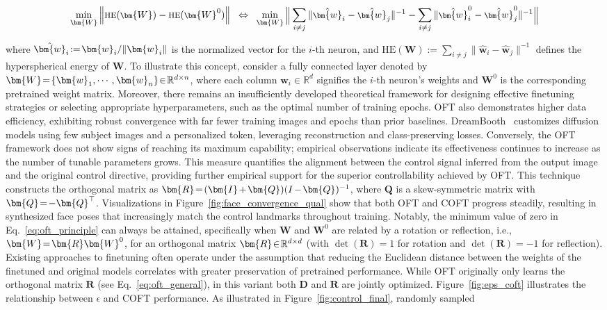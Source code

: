 {\begin{equation}\label{eq:oft_principle}
\footnotesize
\min_{\bm{W}} \left\| \text{HE}(\bm{W})-\text{HE}(\bm{W}^0)\right\|~~\Leftrightarrow~~\min_{\bm{W}} \bigg{\|} \sum_{i\neq j} \|\hat{\bm{w}}_i-\hat{\bm{w}}_j\|^{-1}-\sum_{i\neq j} \|\hat{\bm{w}}^0_i-\hat{\bm{w}}^0_j\|^{-1}\bigg{\|}
\end{equation}

where $\thickmuskip=2mu \medmuskip=2mu \hat{\bm{w}}_i:=\bm{w}_i/\|\bm{w}_i\|$ is the normalized vector for the $i$-th neuron, and $\text{HE}(\bm{W}):= \sum_{i\neq j} \|\hat{\bm{w}}_i-\hat{\bm{w}}_j\|^{-1}$ defines the hyperspherical energy of $\bm{W}$. To illustrate this concept, consider a fully connected layer denoted by $\thickmuskip=2mu \medmuskip=2mu \bm{W}=\{\bm{w}_1,\cdots,\bm{w}_n\}\in\mathbb{R}^{d\times n}$, where each column $\bm{w}_i\in\mathbb{R}^{d}$ signifies the $i$-th neuron's weights and $\bm{W}^0$ is the corresponding pretrained weight matrix. Moreover, there remains an insufficiently developed theoretical framework for designing effective finetuning strategies or selecting appropriate hyperparameters, such as the optimal number of training epochs. OFT also demonstrates higher data efficiency, exhibiting robust convergence with far fewer training images and epochs than prior baselines. DreamBooth~\cite{ruiz2023dreambooth} customizes diffusion models using few subject images and a personalized token, leveraging reconstruction and class-preserving losses. Conversely, the OFT framework does not show signs of reaching its maximum capability; empirical observations indicate its effectiveness continues to increase as the number of tunable parameters grows. This measure quantifies the alignment between the control signal inferred from the output image and the original control directive, providing further empirical support for the superior controllability achieved by OFT. This technique constructs the orthogonal matrix as $\thickmuskip=2mu \medmuskip=2mu \bm{R}=(\bm{I}+\bm{Q})(I-\bm{Q})^{-1}$, where $\bm{Q}$ is a skew-symmetric matrix with $\thickmuskip=2mu \medmuskip=2mu \bm{Q}=-\bm{Q}^\top$. Visualizations in Figure~\ref{fig:face_convergence_qual} show that both OFT and COFT progress steadily, resulting in synthesized face poses that increasingly match the control landmarks throughout training. Notably, the minimum value of zero in Eq.~\eqref{eq:oft_principle} can always be attained, specifically when $\bm{W}$ and $\bm{W}^0$ are related by a rotation or reflection, i.e., $\thickmuskip=2mu \medmuskip=2mu \bm{W}=\bm{R}\bm{W}^0$, for an orthogonal matrix $\thickmuskip=2mu \medmuskip=2mu \bm{R}\in\mathbb{R}^{d\times d}$ (with $\det(\bm{R}) = 1$ for rotation and $\det(\bm{R}) = -1$ for reflection). Existing approaches to finetuning often operate under the assumption that reducing the Euclidean distance between the weights of the finetuned and original models correlates with greater preservation of pretrained performance. While OFT originally only learns the orthogonal matrix $\bm{R}$ (see Eq.~\eqref{eq:oft_general}), in this variant both $\bm{D}$ and $\bm{R}$ are jointly optimized. Figure~\ref{fig:eps_coft} illustrates the relationship between $\epsilon$ and COFT performance. As illustrated in Figure~\ref{fig:control_final}, randomly sampled }
